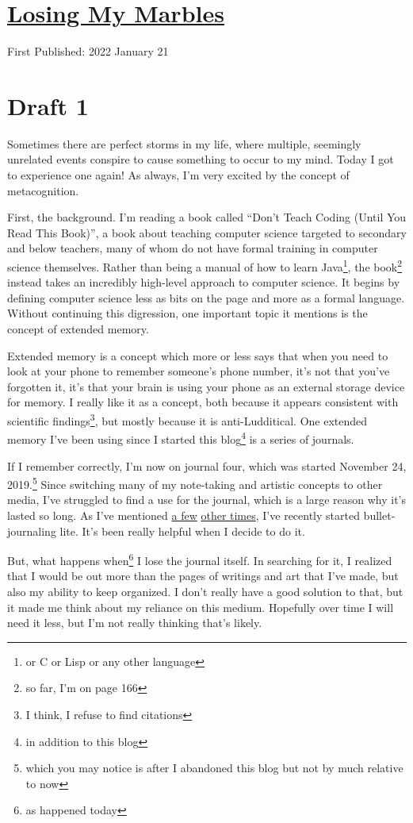 \documentclass[12pt]{article}[titlepage]
\newcommand{\say}[1]{``#1''}
\newcommand{\1}{\={a}}
\newcommand{\2}{\={e}}
\newcommand{\3}{\={\i}}
\newcommand{\4}{\=o}
\newcommand{\5}{\=u}
\newcommand{\6}{\={A}}
\renewcommand{\,}{\textsuperscript{,}}
\begin{document}
\doublespacing
\section{\href{losing-marbles.html}{Losing My Marbles}}
First Published: 2022 January 21

\section{Draft 1}
Sometimes there are perfect storms in my life, where multiple, seemingly unrelated events conspire to cause something to occur to my mind.
Today I got to experience one again!
As always, I'm very excited by the concept of metacognition.

First, the background.
I'm reading a book called \say{Don't Teach Coding (Until You Read This Book)}, a book about teaching computer science targeted to secondary and below teachers, many of whom do not have formal training in computer science themselves.
Rather than being a manual of how to learn Java\footnote{or C or Lisp or any other language}, the book\footnote{so far, I'm on page 166} instead takes an incredibly high-level approach to computer science.
It begins by defining computer science less as bits on the page and more as a formal language.
Without continuing this digression, one important topic it mentions is the concept of extended memory.

Extended memory is a concept which more or less says that when you need to look at your phone to remember someone's phone number, it's not that you've forgotten it, it's that your brain is using your phone as an external storage device for memory.
I really like it as a concept, both because it appears consistent with scientific findings\footnote{I think, I refuse to find citations}, but mostly because it is anti-Ludditical.
One extended memory I've been using since I started this blog\footnote{in addition to this blog} is a series of journals.

If I remember correctly, I'm now on journal four, which was started November 24, 2019.\footnote{which you may notice is after I abandoned this blog but not by much relative to now}
Since switching many of my note-taking and artistic concepts to other media, I've struggled to find a use for the journal, which is a large reason why it's lasted so long.
As I've mentioned \href{living-scheduled.html}{a few} \href{thinking-about-life.html}{other times}, I've recently started bullet-journaling lite.
It's been really helpful when I decide to do it.

But, what happens when\footnote{as happened today} I lose the journal itself.
In searching for it, I realized that I would be out more than the pages of writings and art that I've made, but also my ability to keep organized.
I don't really have a good solution to that, but it made me think about my reliance on this medium.
Hopefully over time I will need it less, but I'm not really thinking that's likely.
\end{document}
